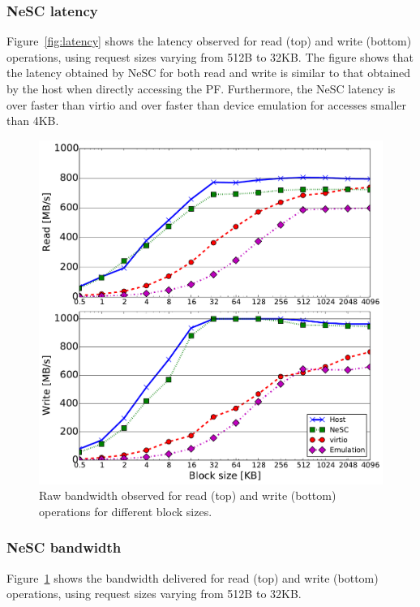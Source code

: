 \subsubsection*{\bf NeSC latency}
Figure~\ref{fig:latency} shows the latency observed for read (top) and write (bottom) operations, using request sizes varying from 512B to 32KB. The figure shows that the latency obtained by NeSC for both read and write is similar to that obtained by the host when directly accessing the PF. Furthermore, the NeSC latency is  over  faster than virtio and over  faster than device emulation for accesses smaller than 4KB.

\begin{figure}[t]
  \centering
  \includegraphics[width=1\columnwidth]{figs/throughput_block_size.pdf}
  \caption{Raw bandwidth observed for read (top) and write (bottom) operations for different block sizes.}
  \label{fig:bw}
\end{figure}

\subsubsection*{\bf NeSC bandwidth}
Figure~\ref{fig:bw} shows the bandwidth delivered for read (top) and write (bottom) operations, using request sizes varying from 512B to 32KB.

